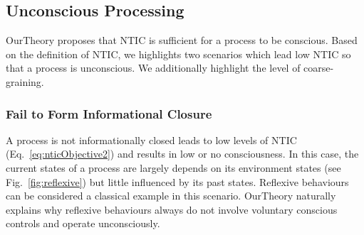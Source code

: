 \documentclass[utf8]{article}
\begin{document}
		
		
		
        \subsection{Unconscious Processing}
            \ac{OurTheory} proposes that NTIC is sufficient for a process to be conscious. Based on the definition of NTIC, we highlights two scenarios which lead low NTIC so that a process is unconscious. We additionally highlight the level of coarse-graining.
        
        
            \subsubsection*{Fail to Form Informational Closure}
                A process is not informationally closed leads to low levels of NTIC (Eq.~\ref{eq:nticObjective2}) and results in low or no consciousness. In this case, the current states of a process are largely depends on its environment states (see Fig.~\ref{fig:reflexive}) but little influenced by its past states. Reflexive behaviours \citep{casali2013theoretically} can be considered a classical example in this scenario. \ac{OurTheory} naturally explains why reflexive behaviours always do not involve voluntary conscious controls and operate unconsciously. 
         
\end{document}
